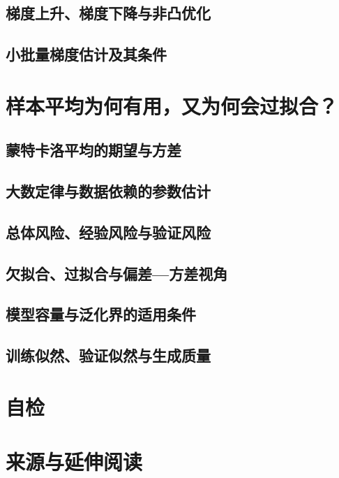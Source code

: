 \subsection{梯度上升、梯度下降与非凸优化}
\label{subsec:mle-gradient}
\contentplaceholder

\subsection{小批量梯度估计及其条件}
\label{subsec:mle-minibatch}
\contentplaceholder

\section{样本平均为何有用，又为何会过拟合？}
\label{sec:mle-generalization}
\contentplaceholder

\subsection{蒙特卡洛平均的期望与方差}
\label{subsec:mle-monte-carlo}
\contentplaceholder

\subsection{大数定律与数据依赖的参数估计}
\label{subsec:mle-data-dependent}
\contentplaceholder

\subsection{总体风险、经验风险与验证风险}
\label{subsec:mle-risk}
\contentplaceholder

\subsection{欠拟合、过拟合与偏差—方差视角}
\label{subsec:mle-fitting}
\contentplaceholder

\subsection{模型容量与泛化界的适用条件}
\label{subsec:mle-bounds}
\contentplaceholder

\subsection{训练似然、验证似然与生成质量}
\label{subsec:mle-evaluation}
\contentplaceholder

\section{自检}
\label{sec:mle-review}
\contentplaceholder

\section{来源与延伸阅读}
\label{sec:mle-reading}
\contentplaceholder
